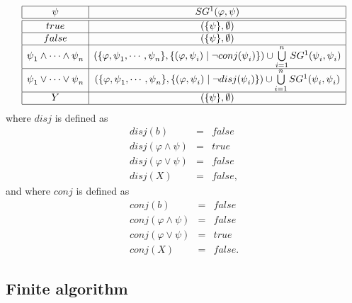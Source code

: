 \begin{equation*}
\begin{array}{|c|c|}
\hline
\psi  & SG^{1}(\varphi ,\psi ) \\ \hline\hline
true & (\{\psi \},\emptyset ) \\ \hline
false & (\{\psi \},\emptyset ) \\ \hline
\psi _{1}\wedge \cdots \wedge \psi _{n} & \left( \{\varphi ,\psi _{1},\cdots
,\psi _{n}\},\{(\varphi ,\psi _{i})\mid \lnot conj(\psi _{i})\}\right) \cup
\bigcup\limits_{i=1}^{n}SG^{1}(\psi _{i},\psi _{i}) \\ \hline
\psi _{1}\vee \cdots \vee \psi _{n} & \left( \{\varphi ,\psi _{1},\cdots
,\psi _{n}\},\{(\varphi ,\psi _{i})\mid \lnot disj(\psi _{i})\}\right) \cup
\bigcup\limits_{i=1}^{n}SG^{1}(\psi _{i},\psi _{i}) \\ \hline
Y & (\{\psi \},\emptyset ) \\ \hline
\end{array}%
\end{equation*}%
where $disj$ is defined as%
\begin{eqnarray*}
disj(b) &=&false \\
disj(\varphi \wedge \psi ) &=&true \\
disj(\varphi \vee \psi ) &=&false \\
disj(X) &=&false,
\end{eqnarray*}%
and where $conj$ is defined as%
\begin{eqnarray*}
conj(b) &=&false \\
conj(\varphi \wedge \psi ) &=&false \\
conj(\varphi \vee \psi ) &=&true \\
conj(X) &=&false.
\end{eqnarray*}

\newpage

\subsection{Finite algorithm}

